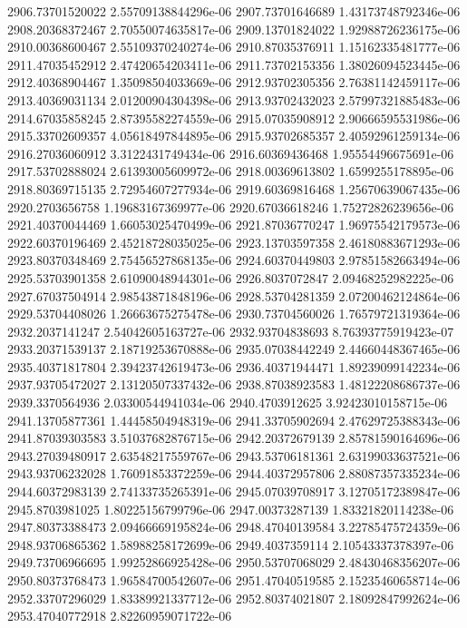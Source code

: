 {2906.73701520022 2.55709138844296e-06
2907.73701646689 1.43173748792346e-06
2908.20368372467 2.70550074635817e-06
2909.13701824022 1.92988726236175e-06
2910.00368600467 2.55109370240274e-06
2910.87035376911 1.15162335481777e-06
2911.47035452912 2.47420654203411e-06
2911.73702153356 1.38026094523445e-06
2912.40368904467 1.35098504033669e-06
2912.93702305356 2.76381142459117e-06
2913.40369031134 2.01200904304398e-06
2913.93702432023 2.57997321885483e-06
2914.67035858245 2.87395582274559e-06
2915.07035908912 2.90666595531986e-06
2915.33702609357 4.05618497844895e-06
2915.93702685357 2.40592961259134e-06
2916.27036060912 3.3122431749434e-06
2916.60369436468 1.95554496675691e-06
2917.53702888024 2.61393005609972e-06
2918.00369613802 1.6599255178895e-06
2918.80369715135 2.72954607277934e-06
2919.60369816468 1.25670639067435e-06
2920.2703656758 1.19683167369977e-06
2920.67036618246 1.75272826239656e-06
2921.40370044469 1.66053025470499e-06
2921.87036770247 1.96975542179573e-06
2922.60370196469 2.45218728035025e-06
2923.13703597358 2.46180883671293e-06
2923.80370348469 2.75456527868135e-06
2924.60370449803 2.97851582663494e-06
2925.53703901358 2.61090048944301e-06
2926.8037072847 2.09468252982225e-06
2927.67037504914 2.98543871848196e-06
2928.53704281359 2.07200462124864e-06
2929.53704408026 1.26663675275478e-06
2930.73704560026 1.76579721319364e-06
2932.2037141247 2.54042605163727e-06
2932.93704838693 8.76393775919423e-07
2933.20371539137 2.18719253670888e-06
2935.07038442249 2.44660448367465e-06
2935.40371817804 2.39423742619473e-06
2936.40371944471 1.89239099142234e-06
2937.93705472027 2.13120507337432e-06
2938.87038923583 1.48122208686737e-06
2939.3370564936 2.03300544941034e-06
2940.4703912625 3.92423010158715e-06
2941.13705877361 1.44458504948319e-06
2941.33705902694 2.47629725388343e-06
2941.87039303583 3.51037682876715e-06
2942.20372679139 2.85781590164696e-06
2943.27039480917 2.63548217559767e-06
2943.53706181361 2.63199033637521e-06
2943.93706232028 1.76091853372259e-06
2944.40372957806 2.88087357335234e-06
2944.60372983139 2.74133735265391e-06
2945.07039708917 3.12705172389847e-06
2945.8703981025 1.80225156799796e-06
2947.00373287139 1.83321820114238e-06
2947.80373388473 2.09466669195824e-06
2948.47040139584 3.22785475724359e-06
2948.93706865362 1.58988258172699e-06
2949.4037359114 2.10543337378397e-06
2949.73706966695 1.99252866925428e-06
2950.53707068029 2.48430468356207e-06
2950.80373768473 1.96584700542607e-06
2951.47040519585 2.15235460658714e-06
2952.33707296029 1.83389921337712e-06
2952.80374021807 2.18092847992624e-06
2953.47040772918 2.82260959071722e-06
}
